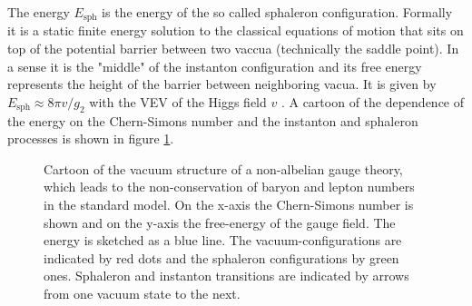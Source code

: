 \documentclass[13pt,a4paper,titlepage]{article}
\begin{document}
The energy $E_{\mathrm{sph}}$ is the energy of the so called sphaleron configuration. Formally it is a static finite energy solution to the classical
equations of motion that sits on top of the potential barrier between two vaccua (technically the saddle point). In a sense it is the "middle" of the instanton configuration and its free energy represents the height of the barrier between
neighboring vacua.
It is given by $E_{\mathrm{sph}} \approx 8\pi v / g_2$ with the VEV of the Higgs field $v$ \cite[eq. 4.5]{Cline:2006ts_Baryogenesis}.
A cartoon of the dependence of the energy on the Chern-Simons number and the instanton and sphaleron processes is shown in figure \ref{fig:sphaleron_cartoon}.
\begin{figure}[H]
    \label{fig:sphaleron_cartoon}
    \centering
    \caption{Cartoon of the vacuum structure of a non-albelian gauge theory, which leads to the non-conservation of baryon and lepton numbers in the standard model.
    On the x-axis the Chern-Simons number is shown and on the y-axis the free-energy of the gauge field.
    The energy is sketched as a blue line. The vacuum-configurations are indicated by red dots and the sphaleron configurations by green ones. Sphaleron and instanton transitions are indicated by arrows from one vacuum state
    to the next.
    }
\end{figure}
\end{document}
